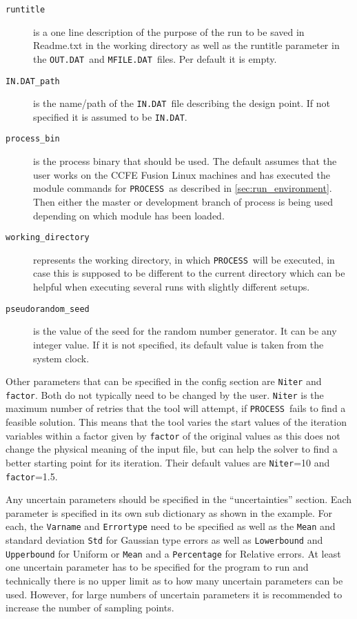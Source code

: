 \documentclass[10pt,a4paper]{article}
\newcommand{\process}{\mbox{\texttt{PROCESS}}}
\newcommand{\mfile}{\mbox{\texttt{MFILE.DAT}}}
\newcommand{\outdat}{\mbox{\texttt{OUT.DAT}}}
\newcommand{\indat}{\mbox{\texttt{IN.DAT}}}
\begin{document}
\begin{description}
\item[\texttt{runtitle}] is a one line description of the purpose of the run to be saved in Readme.txt in the working directory as well as the runtitle parameter in the \outdat\ and \mfile\ files. Per default it is empty. 
\item[\texttt{IN.DAT\_path}] is the name/path of the \indat\ file describing the design point. If not specified it is assumed to be \indat. 
\item[\texttt{process\_bin}] is the process binary that should be used. The default assumes that the user works on the CCFE Fusion Linux machines and has executed the module commands for \process\ as described in \ref{sec:run_environment}. Then either the master or development branch of process is being used depending on which module has been loaded. 
\item[\texttt{working\_directory}] represents the working directory, in which \process\ will be executed, in case this is supposed to be different to the current directory which can be helpful when executing several runs with slightly different setups. 
\item[\texttt{pseudorandom\_seed}] is the value of the seed for the random number generator. It can be any integer value. If it is not specified, its default value is taken from the system clock. 
\end{description}

Other parameters that can be specified in the config section are \texttt{Niter} and \texttt{factor}. Both do not typically need to be changed by the user. \texttt{Niter} is the maximum number of retries that the tool will attempt, if \process\ fails to find a feasible solution. This means that the tool varies the start values of the iteration variables within a factor given by \texttt{factor} of the original values as this does not change the physical meaning of the input file, but can help the solver to find a better starting point for its iteration. Their default values are \texttt{Niter}=10 and \texttt{factor}=1.5.

Any uncertain parameters should be specified in the ``uncertainties'' section. Each parameter is specified in its own sub dictionary as shown in the example. For each, the \texttt{Varname} and \texttt{Errortype} need to be specified as well as the \texttt{Mean} and standard deviation \texttt{Std} for Gaussian type errors as well as \texttt{Lowerbound} and \texttt{Upperbound} for Uniform or \texttt{Mean} and a \texttt{Percentage} for Relative errors. At least one uncertain parameter has to be specified for the program to run and technically there is no upper limit as to how many uncertain parameters can be used. However, for large numbers of uncertain parameters it is recommended to increase the number of sampling points. 
\end{document}
